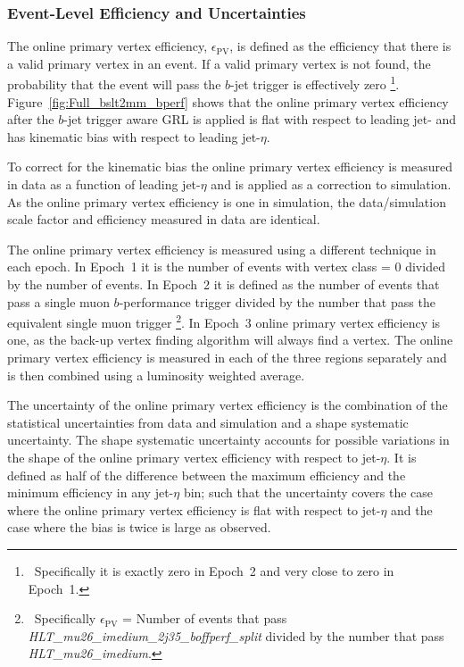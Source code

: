 \subsubsection{Event-Level Efficiency and Uncertainties}
\label{sec:trig-eventLevelEff}

The online primary vertex efficiency, $\epsilon_{\text{PV}}$,
is defined as the efficiency that there is a valid primary vertex in an event.
If a valid primary vertex is not found, the probability that the event will pass the $b$-jet trigger is effectively zero
\footnote{\ Specifically it is exactly zero in Epoch~2 and very close to zero in Epoch~1.}.
Figure~\ref{fig:Full_bslt2mm_bperf} shows that the online primary vertex efficiency
after the $b$-jet trigger aware GRL is applied is flat with respect to leading jet-\pT{}
and has kinematic bias with respect to leading jet-$\eta$.

To correct for the kinematic bias the online primary vertex efficiency is measured in data as a function of leading jet-$\eta$ and is applied as a correction to simulation.
As the online primary vertex efficiency is one in simulation, the data/simulation scale factor and efficiency measured in data are identical.

The online primary vertex efficiency is measured using a different technique in each epoch.
In Epoch~1 it is the number of events with vertex class = 0 divided by the number of events.
In Epoch~2 it is defined as the number of events that pass a single muon $b$-performance trigger divided
by the number that pass the equivalent single muon trigger \footnote{\ Specifically $\epsilon_{\text{PV}}$ = Number of events that pass \textit{HLT\_mu26\_imedium\_2j35\_boffperf\_split}
  divided by the number that pass \textit{HLT\_mu26\_imedium}.}.
In Epoch~3 online primary vertex efficiency is one, as the back-up vertex finding algorithm will always find a vertex.
The online primary vertex efficiency is measured in each of the three regions separately and is then combined using a luminosity weighted average.

The uncertainty of the online primary vertex efficiency is the combination of the statistical uncertainties from data and simulation
and a shape systematic uncertainty.
The shape systematic uncertainty accounts for possible variations in the shape of the online primary vertex efficiency with respect to jet-$\eta$.
It is defined as half of the difference between the maximum efficiency and the minimum efficiency in any jet-$\eta$ bin;
such that the uncertainty covers the case where the online primary vertex efficiency is flat with respect to jet-$\eta$ and
the case where the bias is twice is large as observed.

